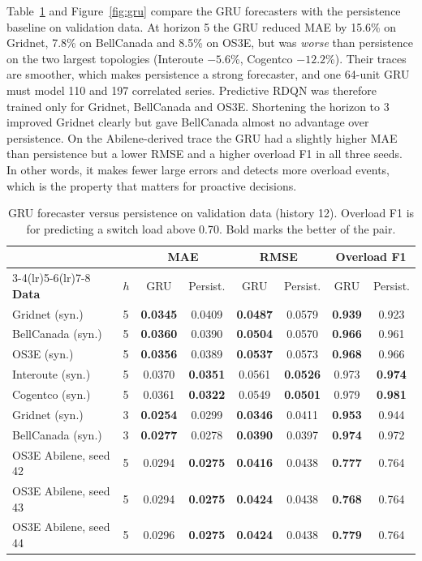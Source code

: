 Table~\ref{tab:gru} and Figure~\ref{fig:gru} compare the GRU forecasters with the persistence baseline on validation data. At horizon 5 the GRU reduced MAE by 15.6\% on Gridnet, 7.8\% on BellCanada and 8.5\% on OS3E, but was \emph{worse} than persistence on the two largest topologies (Interoute $-5.6$\%, Cogentco $-12.2$\%). Their traces are smoother, which makes persistence a strong forecaster, and one 64-unit GRU must model 110 and 197 correlated series. Predictive RDQN was therefore trained only for Gridnet, BellCanada and OS3E. Shortening the horizon to 3 improved Gridnet clearly but gave BellCanada almost no advantage over persistence. On the Abilene-derived trace the GRU had a slightly higher MAE than persistence but a lower RMSE and a higher overload F1 in all three seeds. In other words, it makes fewer large errors and detects more overload events, which is the property that matters for proactive decisions.

\begin{table}[htbp]
\centering
\caption{GRU forecaster versus persistence on validation data (history 12). Overload F1 is for predicting a switch load above 0.70. Bold marks the better of the pair.}
\label{tab:gru}
\small
\begin{tabular}{@{}llcccccc@{}}
\toprule
& & \multicolumn{2}{c}{\textbf{MAE}} & \multicolumn{2}{c}{\textbf{RMSE}} & \multicolumn{2}{c}{\textbf{Overload F1}}\\
\cmidrule(lr){3-4}\cmidrule(lr){5-6}\cmidrule(lr){7-8}
\textbf{Data} & \textbf{$h$} & GRU & Persist. & GRU & Persist. & GRU & Persist.\\
\midrule
Gridnet (syn.)    & 5 & \textbf{0.0345} & 0.0409 & \textbf{0.0487} & 0.0579 & \textbf{0.939} & 0.923\\
BellCanada (syn.) & 5 & \textbf{0.0360} & 0.0390 & \textbf{0.0504} & 0.0570 & \textbf{0.966} & 0.961\\
OS3E (syn.)       & 5 & \textbf{0.0356} & 0.0389 & \textbf{0.0537} & 0.0573 & \textbf{0.968} & 0.966\\
Interoute (syn.)  & 5 & 0.0370 & \textbf{0.0351} & 0.0561 & \textbf{0.0526} & 0.973 & \textbf{0.974}\\
Cogentco (syn.)   & 5 & 0.0361 & \textbf{0.0322} & 0.0549 & \textbf{0.0501} & 0.979 & \textbf{0.981}\\
\midrule
Gridnet (syn.)    & 3 & \textbf{0.0254} & 0.0299 & \textbf{0.0346} & 0.0411 & \textbf{0.953} & 0.944\\
BellCanada (syn.) & 3 & \textbf{0.0277} & 0.0278 & \textbf{0.0390} & 0.0397 & \textbf{0.974} & 0.972\\
\midrule
OS3E Abilene, seed 42 & 5 & 0.0294 & \textbf{0.0275} & \textbf{0.0416} & 0.0438 & \textbf{0.777} & 0.764\\
OS3E Abilene, seed 43 & 5 & 0.0294 & \textbf{0.0275} & \textbf{0.0424} & 0.0438 & \textbf{0.768} & 0.764\\
OS3E Abilene, seed 44 & 5 & 0.0296 & \textbf{0.0275} & \textbf{0.0424} & 0.0438 & \textbf{0.779} & 0.764\\
\bottomrule
\end{tabular}
\end{table}

